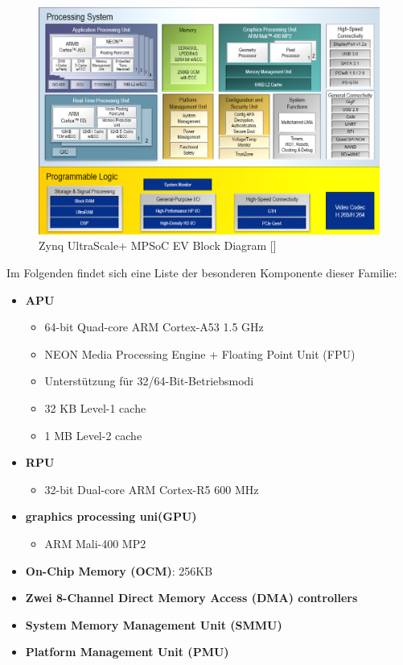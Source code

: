 \begin{figure}[h]
	\begin{center}
		\includegraphics[width=1\textwidth]{./images/zynqmp-blockdiagramm.jpg}
	\end{center}
	\vspace{-5pt}
	\caption[Zynq UltraScale+ MPSoC EV Block Diagram]{Zynq UltraScale+ MPSoC EV Block Diagram [\cite{XilinxInc.}]} %
	\label{fig:zynqmp:block:diagram}
	\vspace{-5pt}
\end{figure}

 Im Folgenden findet sich eine Liste der besonderen Komponente dieser Familie:
 \begin{itemize}
 	\item \textbf{APU}
 	\begin{itemize}
 		\item 64-bit Quad-core ARM Cortex-A53 1.5 GHz
 		\item NEON Media Processing Engine + Floating Point Unit (FPU)
 		\item Unterstützung für 32/64-Bit-Betriebsmodi
 		\item 32 KB Level-1 cache
 		\item 1 MB Level-2 cache
 	\end{itemize}
 	\item \textbf{RPU}
 	\begin{itemize}
 		\item 32-bit Dual-core ARM Cortex-R5  600 MHz
 	\end{itemize}
 	\item \textbf{graphics processing uni(GPU)}
 	\begin{itemize}
 		\item ARM Mali-400 MP2
 	\end{itemize}
 	\item \textbf{On-Chip Memory (OCM)}: 256KB
 	\item \textbf{Zwei 8-Channel Direct Memory Access (DMA) controllers}
 	\item \textbf{System Memory Management Unit (SMMU)}
 	\item \textbf{Platform Management Unit (PMU)}
 \end{itemize}
 
